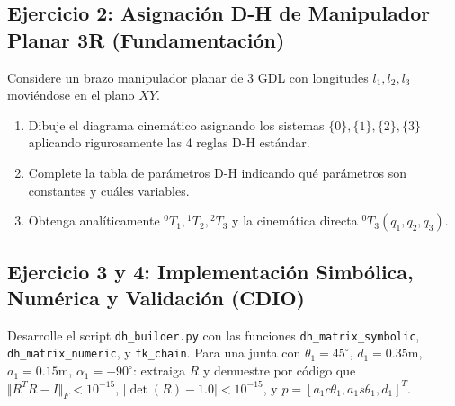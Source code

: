 \documentclass[11pt, a4paper]{article}
\begin{document}
\subsection*{Ejercicio 2: Asignación D-H de Manipulador Planar 3R (Fundamentación)}
Considere un brazo manipulador planar de 3 GDL con longitudes $l_1, l_2, l_3$ moviéndose en el plano $XY$.
\begin{center}
\end{center}

\begin{enumerate}
    \item Dibuje el diagrama cinemático asignando los sistemas $\{0\}, \{1\}, \{2\}, \{3\}$ aplicando rigurosamente las 4 reglas D-H estándar.
    \item Complete la tabla de parámetros D-H indicando qué parámetros son constantes y cuáles variables.
    \item Obtenga analíticamente $^{0}T_1, {}^{1}T_2, {}^{2}T_3$ y la cinemática directa $^{0}T_3(q_1, q_2, q_3)$.
\end{enumerate}

\subsection*{Ejercicio 3 y 4: Implementación Simbólica, Numérica y Validación (CDIO)}
Desarrolle el script \texttt{dh\_builder.py} con las funciones \texttt{dh\_matrix\_symbolic}, \texttt{dh\_matrix\_numeric}, y \texttt{fk\_chain}. Para una junta con $\theta_1 = 45^\circ$, $d_1 = 0.35\text{m}$, $a_1 = 0.15\text{m}$, $\alpha_1 = -90^\circ$: extraiga $R$ y demuestre por código que $\Vert R^T R - I \Vert_F < 10^{-15}$, $\vert \det(R) - 1.0 \vert < 10^{-15}$, y $p = [a_1 c\theta_1, a_1 s\theta_1, d_1]^T$.
\end{document}
